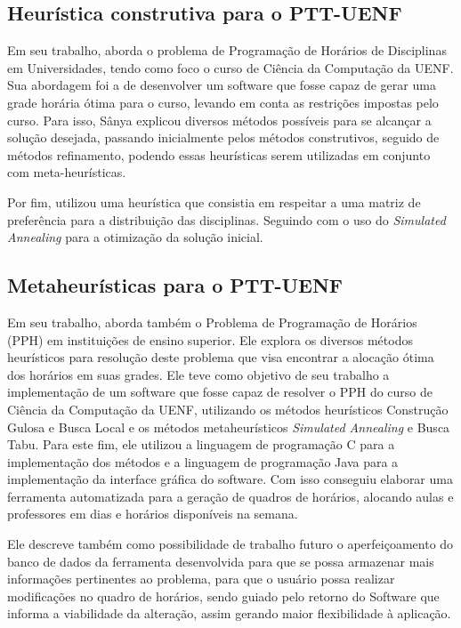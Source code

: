 \subsection{Heurística construtiva para o PTT-UENF} \label{ssec:sanya}     %

Em seu trabalho,  aborda o problema de Programação de Horários de Disciplinas em Universidades, tendo como foco o curso de Ciência da Computação da UENF. Sua abordagem foi a de desenvolver um software que fosse capaz de gerar uma grade horária ótima para o curso, levando em conta as restrições impostas pelo curso. Para isso, Sânya explicou diversos métodos possíveis para se alcançar a solução desejada, passando inicialmente pelos métodos construtivos, seguido de métodos refinamento, podendo essas heurísticas serem utilizadas em conjunto com meta-heurísticas.

Por fim, utilizou uma heurística que consistia em respeitar a uma matriz de preferência para a distribuição das disciplinas. Seguindo com o uso do \textit{Simulated Annealing} para a otimização da solução inicial.

\subsection{Metaheurísticas para o PTT-UENF} \label{ssec:ricardo}   %

Em seu trabalho,  aborda também o Problema de Programação de Horários (PPH) em instituições de ensino superior. Ele explora os diversos métodos heurísticos para resolução deste problema que visa encontrar a alocação ótima dos horários em suas grades. Ele teve como objetivo de seu trabalho a implementação de um software que fosse capaz de resolver o PPH do curso de Ciência da Computação da UENF, utilizando os métodos heurísticos Construção Gulosa e Busca Local e os métodos metaheurísticos \textit{Simulated Annealing} e Busca Tabu. Para este fim, ele utilizou a linguagem de programação C para a implementação dos métodos e a linguagem de programação Java para a implementação da interface gráfica do software. Com isso conseguiu elaborar uma ferramenta automatizada para a geração de quadros de horários, alocando aulas e professores em dias e horários disponíveis na semana.

Ele descreve também como possibilidade de trabalho futuro o aperfeiçoamento do banco de dados da ferramenta desenvolvida para que se possa armazenar mais informações pertinentes ao problema, para que o usuário possa realizar modificações no quadro de horários, sendo guiado pelo retorno do Software que informa a viabilidade da alteração, assim gerando maior flexibilidade à aplicação.

